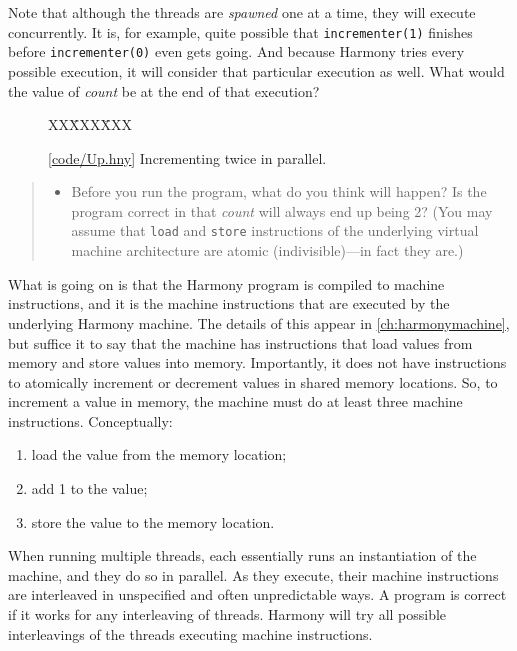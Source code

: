 \documentclass{report}
\newcommand{\harmonysource}[1]{
\begin{tabbing}
XX\=XXX\=XXX\kill
    
\end{tabbing}
}
\newcommand{\harmonylink}[1]{%
[\href{https://harmony.cs.cornell.edu/#1}{\underline{#1}}]%
}
\newenvironment{code}{
\tcolorbox
}{
\endtcolorbox
}
\begin{document}
Note that although the threads are \emph{spawned} one at a time,
they will execute concurrently.  It is, for example, quite possible
that \texttt{incrementer(1)} finishes before \texttt{incrementer(0)}
even gets going.
And because Harmony tries every possible execution, it will consider
that particular execution as well.
What would the value of \textit{count} be at the end of that execution?

\begin{figure}[h]
\begin{code}
\harmonysource{Up}
\end{code}
\caption{\harmonylink{code/Up.hny} Incrementing twice in parallel.}
\label{fig:inc}
\end{figure}

\begin{quote}
\begin{itemize}
\item Before you run the program, what do you think will happen?  Is the
program correct in that \textit{count} will always end up being 2?
(You may assume that \texttt{load} and \texttt{store} instructions of the
underlying virtual machine architecture are atomic (indivisible)---in fact
they are.)
\end{itemize}
\end{quote}

%

What is going on is that the Harmony program is compiled to machine instructions,
%
and it is the machine instructions that are executed by the underlying Harmony
machine.  The details of this appear in \autoref{ch:harmonymachine},
but suffice it to
say that the machine has instructions that load values from memory and store
values into memory.  Importantly, it does not have instructions to atomically
increment or decrement values in shared memory locations.
So, to increment a value in memory,
the machine must do at least three machine instructions.  Conceptually:
\begin{enumerate}
\item load the value from the memory location;
\item add 1 to the value;
\item store the value to the memory location.
\end{enumerate}

When running multiple threads, each essentially runs an instantiation of
the machine, and they do so in parallel.  As they execute, their machine
instructions are interleaved
%
in unspecified and often unpredictable ways.
A program is correct if it works for any interleaving of threads.
Harmony will try all possible interleavings of the threads
executing machine instructions.
\end{document}
